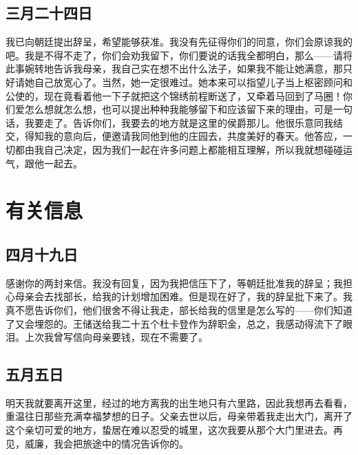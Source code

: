 \documentclass[12pt,oneside]{book}
\begin{document}
\chapter{三月二十四日}
\label{sec-3-11}
我已向朝廷提出辞呈，希望能够获准。我没有先征得你们的同意，你们会原谅我的吧。我是不得不走了，你们会劝我留下，你们要说的话我全都明白，那么——请将此事婉转地告诉我母亲，我自己实在想不出什么法子，如果我不能让她满意，那只好请她自己放宽心了。当然，她一定很难过。她本来可以指望儿子当上枢密顾问和公使的，现在竟看着他一下子就把这个锦绣前程断送了，又牵着马回到了马圈！你们爱怎么想就怎么想，也可以提出种种我能够留下和应该留下来的理由，可是一句话，我要走了。告诉你们，我要去的地方就是这里的侯爵那儿。他很乐意同我结交，得知我的意向后，便邀请我同他到他的庄园去，共度美好的春天。他答应，一切都由我自己决定，因为我们一起在许多问题上都能相互理解，所以我就想碰碰运气，跟他一起去。



\part{有关信息}
\label{sec-4}
\chapter{四月十九日}
\label{sec-4-1}
感谢你的两封来信。我没有回复，因为我把信压下了，等朝廷批准我的辞呈；我担心母亲会去找部长，给我的计划增加困难。但是现在好了，我的辞呈批下来了。我真不愿告诉你们，他们很舍不得让我走，部长给我的信里是怎么写的——你们知道了又会埋怨的。王储送给我二十五个杜卡登作为辞职金，总之，我感动得流下了眼泪。上次我曾写信向母亲要钱，现在不需要了。
　　

\chapter{五月五日}
\label{sec-4-2}
明天我就要离开这里，经过的地方离我的出生地只有六里路，因此我想再去看看，重温往日那些充满幸福梦想的日子。父亲去世以后，母亲带着我走出大门，离开了这个亲切可爱的地方，蛰居在难以忍受的城里，这次我要从那个大门里进去。再见，威廉，我会把旅途中的情况告诉你的。
　　
\end{document}
